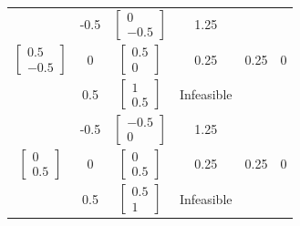 \begin{latin}
\begin{longtable}{|c|c|c|c|c|c|}
		& -0.5 &$\begin{bmatrix} 0 \\ -0.5 \end{bmatrix}$      &      1.25     &        &         \\ \cline{2-4}
		\multirow{-3}{*}{$\begin{bmatrix} 0.5 \\ -0.5 \end{bmatrix}$}& 0   &$\begin{bmatrix} 0.5 \\ 0 \end{bmatrix}$      &       0.25                 &      0.25       &  0  \\ \cline{2-4}
		& 0.5  &$\begin{bmatrix} 1 \\ 0.5 \end{bmatrix}$      & Infeasible                        &   &                \\	\cline{2-4} \hline
		
		&            -0.5            &$\begin{bmatrix} -0.5 \\ 0 \end{bmatrix}$      &     1.25             &         &         \\  \cline{2-4} 
		\multirow{-3}{*}{$\begin{bmatrix} 0 \\ 0.5 \end{bmatrix}$}&        0                &$\begin{bmatrix} 0 \\ 0.5 \end{bmatrix}$      &      0.25                  &  0.25            &  0  \\  \cline{2-4} 
		&           0.5             &$\begin{bmatrix} 0.5 \\ 1 \end{bmatrix}$      & Infeasible                        &          &  \\  \cline{2-4} \hline
		

\end{longtable}
\end{latin}
